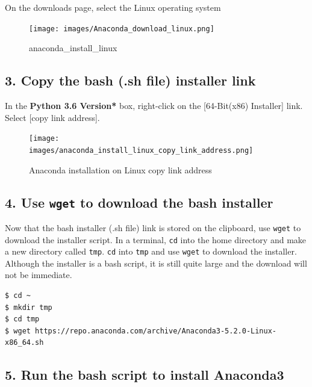 \documentclass{book}
\begin{document}
On the downloads page, select the Linux operating system

\begin{figure}
\centering
\texttt{[image: images/Anaconda\_download\_linux.png]}
\caption{anaconda\_install\_linux}
\end{figure}
    




    
        \subsection{3. Copy the bash (.sh file) installer
link}\label{copy-the-bash-.sh-file-installer-link}

In the \textbf{Python 3.6 Version* } box, right-click on the
{[}64-Bit(x86) Installer{]} link. Select {[}copy link address{]}.

\begin{figure}
\centering
\texttt{[image: images/anaconda\_install\_linux\_copy\_link\_address.png]}
\caption{Anaconda installation on Linux copy link address}
\end{figure}
    




    
        \subsection{\texorpdfstring{4. Use \texttt{wget} to download the bash
installer}{4. Use wget to download the bash installer}}\label{use-wget-to-download-the-bash-installer}

Now that the bash installer (.sh file) link is stored on the clipboard,
use \lstinline!wget! to download the installer script. In a terminal,
\lstinline!cd! into the home directory and make a new directory called
\lstinline!tmp!. \lstinline!cd! into \lstinline!tmp! and use
\lstinline!wget! to download the installer. Although the installer is a
bash script, it is still quite large and the download will not be
immediate.

\begin{lstlisting}
$ cd ~
$ mkdir tmp
$ cd tmp
$ wget https://repo.anaconda.com/archive/Anaconda3-5.2.0-Linux-x86_64.sh 
\end{lstlisting}
    




    
        \subsection{\texorpdfstring{5. Run the bash script to install
\textbf{Anaconda3}}{5. Run the bash script to install Anaconda3}}\label{run-the-bash-script-to-install-anaconda3}
\end{document}

